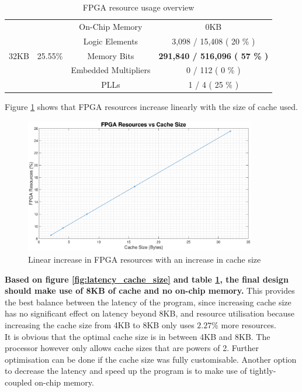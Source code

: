 \documentclass{article}
\begin{document}
\begin{table}[H]
\begin{tabular}{|c|c|c|c|}
    \hline
    \multirow{5}{*}{32KB} & \multirow{5}{*}{25.55\%} & On-Chip Memory & 0KB \\
\cline{3-4}          &       & Logic Elements & 3,098 / 15,408 ( 20 \% ) \\
\cline{3-4}          &       & Memory Bits & \textbf{291,840 / 516,096 ( 57 \% )} \\
\cline{3-4}          &       & Embedded Multipliers & 0 / 112 ( 0 \% ) \\
\cline{3-4}          &       & PLLs  & 1 / 4 ( 25 \% ) \\
    \hline
    \end{tabular}%
    \caption{FPGA resource usage overview}
    \label{tab:fpga_resource_usage}
\end{table}%


Figure \ref{fig:fpga_cache_size} shows that FPGA resources increase linearly with the size of cache used.

\begin{figure}[H]
    \centering
    \includegraphics[width=0.9\textwidth]{graph1.eps}
    \caption{Linear increase in FPGA resources with an increase in cache size}
    \label{fig:fpga_cache_size}
\end{figure}

\textbf{Based on figure \ref{fig:latency_cache_size} and table \ref{tab:fpga_resource_usage}, the final design should make use of 8KB of cache and no on-chip memory.} This provides the best balance between the latency of the program, since increasing cache size has no significant effect on latency beyond 8KB, and resource utilisation because increasing the cache size from 4KB to 8KB only uses $2.27\%$ more resources.\\

It is obvious that the optimal cache size is in between 4KB and 8KB. The processor however only allows cache sizes that are powers of 2. Further optimisation can be done if the cache size was fully customisable. Another option to decrease the latency and speed up the program is to make use of tightly-coupled on-chip memory. 
\end{document}

